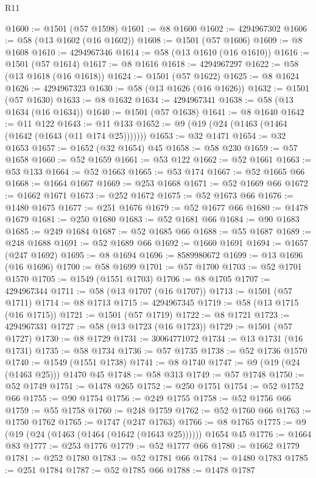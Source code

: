\begin{lexlean}{R11}
\begin{coremodule}
@1600 := @1501 (@57 @1598)
@1601 := @8 @1600
@1602 := 4294967302
@1606 := @58 (@13 @1602 (@16 @1602))
@1608 := @1501 (@57 @1606)
@1609 := @8 @1608
@1610 := 4294967346
@1614 := @58 (@13 @1610 (@16 @1610))
@1616 := @1501 (@57 @1614)
@1617 := @8 @1616
@1618 := 4294967297
@1622 := @58 (@13 @1618 (@16 @1618))
@1624 := @1501 (@57 @1622)
@1625 := @8 @1624
@1626 := 4294967323
@1630 := @58 (@13 @1626 (@16 @1626))
@1632 := @1501 (@57 @1630)
@1633 := @8 @1632
@1634 := 4294967341
@1638 := @58 (@13 @1634 (@16 @1634))
@1640 := @1501 (@57 @1638)
@1641 := @8 @1640
@1642 := @11 @122
@1643 := @11 @133
@1652 := @9 (@19 (@24 (@1463 (@1464 (@1642 (@1643 (@11 @174 @25)))))))
@1653 := @32 @1471
@1654 := @32 @1653
@1657 := @1652 (@32 @1654) @45
@1658 := @58 @230
@1659 := @57 @1658
@1660 := @52 @1659
@1661 := @53 @122
@1662 := @52 @1661
@1663 := @53 @133
@1664 := @52 @1663
@1665 := @53 @174
@1667 := @52 @1665 @66
@1668 := @1664 @1667
@1669 := @253 @1668
@1671 := @52 @1669 @66
@1672 := @1662 @1671
@1673 := @252 @1672
@1675 := @52 @1673 @66
@1676 := @1480 @1675
@1677 := @251 @1676
@1679 := @52 @1677 @66
@1680 := @1478 @1679
@1681 := @250 @1680
@1683 := @52 @1681 @66
@1684 := @90 @1683
@1685 := @249 @1684
@1687 := @52 @1685 @66
@1688 := @55 @1687
@1689 := @248 @1688
@1691 := @52 @1689 @66
@1692 := @1660 @1691
@1694 := @1657 (@247 @1692)
@1695 := @8 @1694
@1696 := 8589980672
@1699 := @13 @1696 (@16 @1696)
@1700 := @58 @1699
@1701 := @57 @1700
@1703 := @52 @1701 @1570
@1705 := @1549 (@1551 @1703)
@1706 := @8 @1705
@1707 := 4294967344
@1711 := @58 (@13 @1707 (@16 @1707))
@1713 := @1501 (@57 @1711)
@1714 := @8 @1713
@1715 := 4294967345
@1719 := @58 (@13 @1715 (@16 @1715))
@1721 := @1501 (@57 @1719)
@1722 := @8 @1721
@1723 := 4294967331
@1727 := @58 (@13 @1723 (@16 @1723))
@1729 := @1501 (@57 @1727)
@1730 := @8 @1729
@1731 := 30064771072
@1734 := @13 @1731 (@16 @1731)
@1735 := @58 @1734
@1736 := @57 @1735
@1738 := @52 @1736 @1570
@1740 := @1549 (@1551 @1738)
@1741 := @8 @1740
@1747 := @9 (@19 (@24 (@1463 @25))) @1470 @45
@1748 := @58 @313
@1749 := @57 @1748
@1750 := @52 @1749
@1751 := @1478 @265
@1752 := @250 @1751
@1754 := @52 @1752 @66
@1755 := @90 @1754
@1756 := @249 @1755
@1758 := @52 @1756 @66
@1759 := @55 @1758
@1760 := @248 @1759
@1762 := @52 @1760 @66
@1763 := @1750 @1762
@1765 := @1747 (@247 @1763)
@1766 := @8 @1765
@1775 := @9 (@19 (@24 (@1463 (@1464 (@1642 (@1643 @25)))))) @1654 @45
@1776 := @1664 @83
@1777 := @253 @1776
@1779 := @52 @1777 @66
@1780 := @1662 @1779
@1781 := @252 @1780
@1783 := @52 @1781 @66
@1784 := @1480 @1783
@1785 := @251 @1784
@1787 := @52 @1785 @66
@1788 := @1478 @1787

\end{coremodule}
\end{lexlean}
